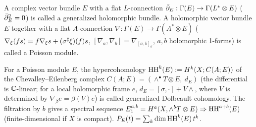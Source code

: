 \begin{defn}\tC\label{defn:GH}
A complex vector bundle $E$ with a flat $L$-connection $\bar\partial_E:\Gamma(E)\to\Gamma(L^*\otimes E)$ ($\bar\partial_E^2=0$) is called a generalized holomorphic bundle. A holomorphic vector bundle $E$ together with a flat $A$-connection $\nabla:\Gamma(E)\to\Gamma(A^*\otimes E)$ ($\nabla_\xi(fs)=f\nabla_\xi s+(\sigma^\sharp\xi)(f)s$, $[\nabla_a,\nabla_b]=\nabla_{[a,b]_\sigma}$, $a,b$ holomorphic 1-forms) is called a Poisson module.
\end{defn}

\begin{defn}\label{defn:HH}
For a Poisson module $E$, the hypercohomology $\mathrm{HH}^k(E):=H^k(X;C(A;E))$ of the Chevalley--Eilenberg complex $C(A;E)=(\wedge^\bullet T\otimes E,\ d_E)$ (the differential is $\mathbb C$-linear; for a local holomorphic frame $e$, $d_E=[\sigma,\cdot]+V\wedge$, where $V$ is determined by $\nabla_\beta e=\beta(V)e$) is called generalized Dolbeault cohomology. The filtration by $b$ gives a spectral sequence $E_1^{a,b}=H^a(X,\wedge^bT\otimes E)\Rightarrow\mathrm{HH}^{a+b}(E)$ (finite-dimensional if $X$ is compact). $P_E(t)=\sum_k\dim\mathrm{HH}^k(E)\,t^k$.
\end{defn}

